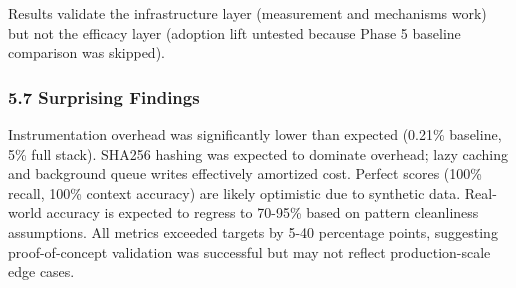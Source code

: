 Results validate the infrastructure layer (measurement and mechanisms work) but not the efficacy layer (adoption lift untested because Phase 5 baseline comparison was skipped).

\subsubsection{5.7 Surprising Findings}

Instrumentation overhead was significantly lower than expected (0.21\% baseline, 5\% full stack). SHA256 hashing was expected to dominate overhead; lazy caching and background queue writes effectively amortized cost. Perfect scores (100\% recall, 100\% context accuracy) are likely optimistic due to synthetic data. Real-world accuracy is expected to regress to 70-95\% based on pattern cleanliness assumptions. All metrics exceeded targets by 5-40 percentage points, suggesting proof-of-concept validation was successful but may not reflect production-scale edge cases.
